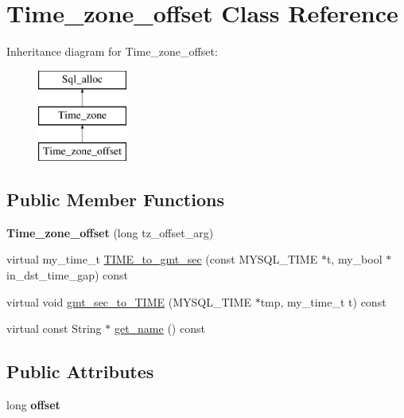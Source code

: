 \hypertarget{classTime__zone__offset}{}\section{Time\+\_\+zone\+\_\+offset Class Reference}
\label{classTime__zone__offset}
Inheritance diagram for Time\+\_\+zone\+\_\+offset\+:\begin{figure}[H]
\begin{center}
\leavevmode
\includegraphics[height=3.000000cm]{classTime__zone__offset}
\end{center}
\end{figure}
\subsection*{Public Member Functions}
\begin{DoxyCompactItemize}
\item 
\mbox{\label{classTime__zone__offset_adff8d2df081b756b3700ff0a0570467d}} 
{\bfseries Time\+\_\+zone\+\_\+offset} (long tz\+\_\+offset\+\_\+arg)
\item 
virtual my\+\_\+time\+\_\+t \mbox{\hyperlink{classTime__zone__offset_ac37e335674d53e44a91772e755eac709}{T\+I\+M\+E\+\_\+to\+\_\+gmt\+\_\+sec}} (const M\+Y\+S\+Q\+L\+\_\+\+T\+I\+ME $\ast$t, my\+\_\+bool $\ast$in\+\_\+dst\+\_\+time\+\_\+gap) const
\item 
virtual void \mbox{\hyperlink{classTime__zone__offset_ad6f8ec41d8d908cdc49e699fa16deff2}{gmt\+\_\+sec\+\_\+to\+\_\+\+T\+I\+ME}} (M\+Y\+S\+Q\+L\+\_\+\+T\+I\+ME $\ast$tmp, my\+\_\+time\+\_\+t t) const
\item 
virtual const String $\ast$ \mbox{\hyperlink{classTime__zone__offset_a4d9694d180deaca9af20beb7e785d9dd}{get\+\_\+name}} () const
\end{DoxyCompactItemize}
\subsection*{Public Attributes}
\begin{DoxyCompactItemize}
\item 
\mbox{\label{classTime__zone__offset_a65cf9e562ceb634a2ab149953507f700}} 
long {\bfseries offset}
\end{DoxyCompactItemize}
